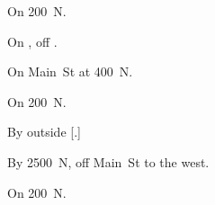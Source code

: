 
\begin{LocationList}

On  200~N.

On , off  .

On  Main~St at  400~N.

On  200~N.

By  outside [.]

By  2500~N, off  Main~St to the west.

\Location{\TruckStop \Gas \Rest \Service \Weigh}
On  200~N.

\end{LocationList}

